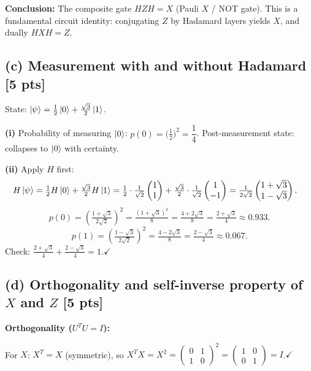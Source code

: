 \documentclass[11pt,a4paper]{article}
\begin{document}
\noindent\textbf{Conclusion:} The composite gate $HZH=X$ (Pauli $X$ / NOT gate). This is a fundamental
circuit identity: conjugating $Z$ by Hadamard layers yields $X$, and dually $HXH=Z$.

\subsection*{(c) Measurement with and without Hadamard [5 pts]}

State: $\ket{\psi}=\frac{1}{2}\ket{0}+\frac{\sqrt{3}}{2}\ket{1}$.

\textbf{(i)} Probability of measuring $\ket{0}$: $p(0)=\bigl(\tfrac{1}{2}\bigr)^2=\dfrac{1}{4}$.
Post-measurement state: collapses to $\ket{0}$ with certainty.

\textbf{(ii)} Apply $H$ first:
\begin{align*}
H\ket{\psi} &= \tfrac{1}{2}H\ket{0}+\tfrac{\sqrt{3}}{2}H\ket{1}
= \tfrac{1}{2}\cdot\tfrac{1}{\sqrt{2}}\begin{pmatrix}1\\1\end{pmatrix}
  +\tfrac{\sqrt{3}}{2}\cdot\tfrac{1}{\sqrt{2}}\begin{pmatrix}1\\-1\end{pmatrix}
= \tfrac{1}{2\sqrt{2}}\begin{pmatrix}1+\sqrt{3}\\1-\sqrt{3}\end{pmatrix}.
\end{align*}
\[
p(0)=\left(\tfrac{1+\sqrt{3}}{2\sqrt{2}}\right)^2=\tfrac{(1+\sqrt{3})^2}{8}
=\tfrac{4+2\sqrt{3}}{8}=\tfrac{2+\sqrt{3}}{4}\approx0.933.
\]
\[
p(1)=\left(\tfrac{1-\sqrt{3}}{2\sqrt{2}}\right)^2=\tfrac{4-2\sqrt{3}}{8}=\tfrac{2-\sqrt{3}}{4}\approx0.067.
\]
Check: $\tfrac{2+\sqrt{3}}{4}+\tfrac{2-\sqrt{3}}{4}=1$.\;$\checkmark$

\subsection*{(d) Orthogonality and self-inverse property of $X$ and $Z$ [5 pts]}

\textbf{Orthogonality ($U^TU=I$):}

For $X$: $X^T=X$ (symmetric), so $X^TX=X^2=\begin{pmatrix}0&1\\1&0\end{pmatrix}^2=\begin{pmatrix}1&0\\0&1\end{pmatrix}=I$.\;$\checkmark$
\end{document}
